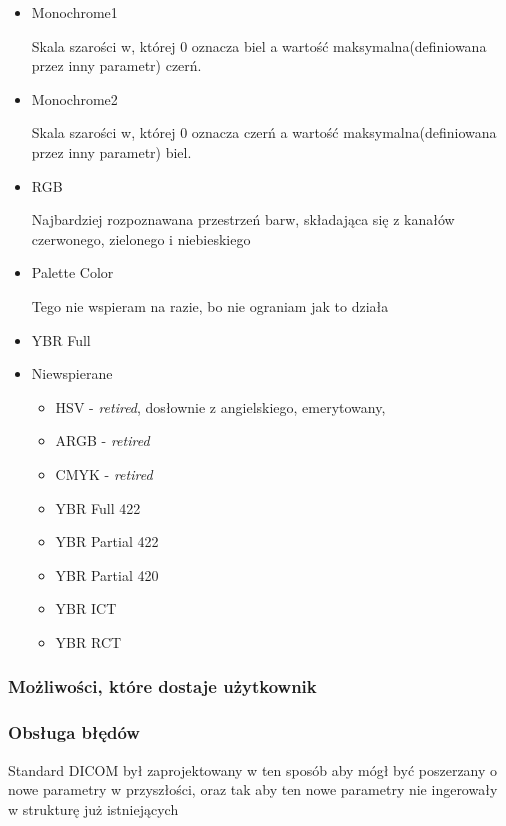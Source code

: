 \begin{itemize}
    \item Monochrome1

    Skala szarości w, której 0 oznacza biel a wartość maksymalna(definiowana przez inny parametr) czerń.

    \item Monochrome2

    Skala szarości w, której 0 oznacza czerń a wartość maksymalna(definiowana przez inny parametr) biel.

    \item RGB

    Najbardziej rozpoznawana przestrzeń barw, składająca się z kanałów czerwonego, zielonego i niebieskiego

    \item Palette Color

    Tego nie wspieram na razie, bo nie ograniam jak to działa

    \item YBR Full


    \item Niewspierane
    \begin{itemize}
        \item HSV - \textit{retired}, dosłownie z angielskiego, emerytowany,
        \item ARGB - \textit{retired}
        \item CMYK - \textit{retired}
        \item YBR Full 422
        \item YBR Partial 422
        \item YBR Partial 420
        \item YBR ICT
        \item YBR RCT
    \end{itemize}

\end{itemize}

\subsubsection{Możliwości, które dostaje użytkownik}

\subsubsection{Obsługa błędów}

Standard DICOM był zaprojektowany w ten sposób aby mógł być poszerzany o nowe parametry w przyszłości, oraz tak aby ten nowe parametry nie ingerowały w strukturę już istniejących
